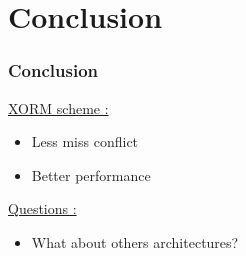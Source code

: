 \documentclass{beamer}
\begin{document}
\section{Conclusion}
\begin{frame}
\frametitle{Conclusion}
\underline{XORM scheme :}
\begin{exampleblock}{}
\begin{itemize}
\item Less miss conflict
\item Better performance
\end{itemize}
\end{exampleblock}{}
\underline{Questions :}
\begin{exampleblock}{}
\begin{itemize}
\item What about others architectures?
\end{itemize}
\end{exampleblock}{}
\end{frame}


\end{document}
